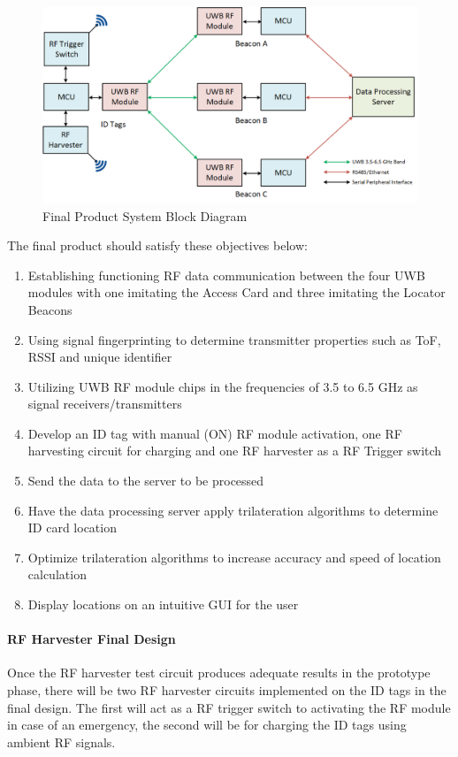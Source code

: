 \begin{figure}[h!]
    \centering
    \includegraphics[width=\linewidth]{./images/03_sys_Final.png}
    \caption{Final Product System Block Diagram}
    \label{final_prod_sys_blk}
\end{figure}
\bigskip

The final product should satisfy these objectives below:

\begin{enumerate}
    \item Establishing functioning RF data communication between the four UWB modules with
    one imitating the Access Card and three imitating the Locator Beacons
    \item Using signal fingerprinting to determine transmitter properties such as ToF, RSSI
    and unique identifier
    \item Utilizing UWB RF module chips in the frequencies of 3.5 to 6.5 GHz as signal receivers/transmitters
    \item Develop an ID tag with manual (ON) RF module activation, one RF harvesting circuit
    for charging and one RF harvester as a RF Trigger switch
    \item Send the data to the server to be processed
    \item Have the data processing server apply trilateration algorithms to determine ID card location
    \item Optimize trilateration algorithms to increase accuracy and speed of location calculation
    \item Display locations on an intuitive GUI for the user
\end{enumerate}

\break
\paragraph{RF Harvester Final Design}
Once the RF harvester test circuit produces adequate results in the prototype phase, there will be two RF harvester circuits implemented on the ID tags in the final design. The first will act as a RF trigger switch to activating the RF module in case of an emergency, the second will be for charging the ID tags using ambient RF signals.

